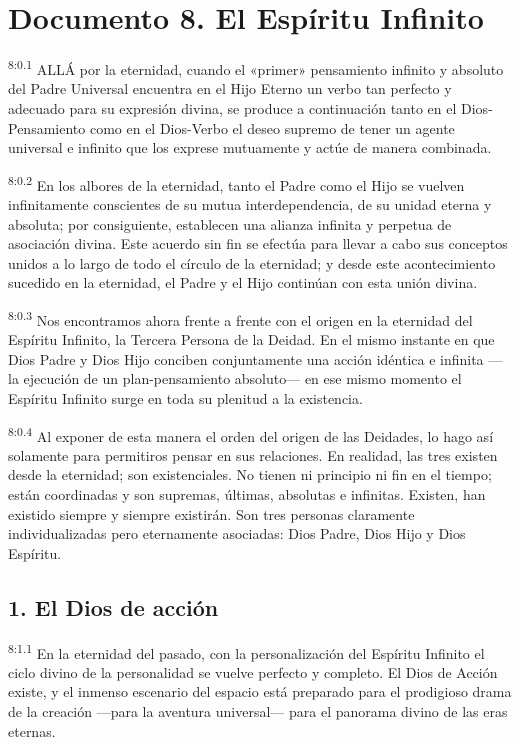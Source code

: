 \chapter{Documento 8. El Espíritu Infinito}
\par
\textsuperscript{8:0.1} ALLÁ por la eternidad, cuando el «primer» pensamiento infinito y absoluto del Padre Universal encuentra en el Hijo Eterno un verbo tan perfecto y adecuado para su expresión divina, se produce a continuación tanto en el Dios-Pensamiento como en el Dios-Verbo el deseo supremo de tener un agente universal e infinito que los exprese mutuamente y actúe de manera combinada.

\par
\textsuperscript{8:0.2} En los albores de la eternidad, tanto el Padre como el Hijo se vuelven infinitamente conscientes de su mutua interdependencia, de su unidad eterna y absoluta; por consiguiente, establecen una alianza infinita y perpetua de asociación divina. Este acuerdo sin fin se efectúa para llevar a cabo sus conceptos unidos a lo largo de todo el círculo de la eternidad; y desde este acontecimiento sucedido en la eternidad, el Padre y el Hijo continúan con esta unión divina.

\par
\textsuperscript{8:0.3} Nos encontramos ahora frente a frente con el origen en la eternidad del Espíritu Infinito, la Tercera Persona de la Deidad. En el mismo instante en que Dios Padre y Dios Hijo conciben conjuntamente una acción idéntica e infinita ---la ejecución de un plan-pensamiento absoluto--- en ese mismo momento el Espíritu Infinito surge en toda su plenitud a la existencia.

\par
\textsuperscript{8:0.4} Al exponer de esta manera el orden del origen de las Deidades, lo hago así solamente para permitiros pensar en sus relaciones. En realidad, las tres existen desde la eternidad; son existenciales. No tienen ni principio ni fin en el tiempo; están coordinadas y son supremas, últimas, absolutas e infinitas. Existen, han existido siempre y siempre existirán. Son tres personas claramente individualizadas pero eternamente asociadas: Dios Padre, Dios Hijo y Dios Espíritu.

\section*{1. El Dios de acción}
\par
\textsuperscript{8:1.1} En la eternidad del pasado, con la personalización del Espíritu Infinito el ciclo divino de la personalidad se vuelve perfecto y completo. El Dios de Acción existe, y el inmenso escenario del espacio está preparado para el prodigioso drama de la creación ---para la aventura universal--- para el panorama divino de las eras eternas.

